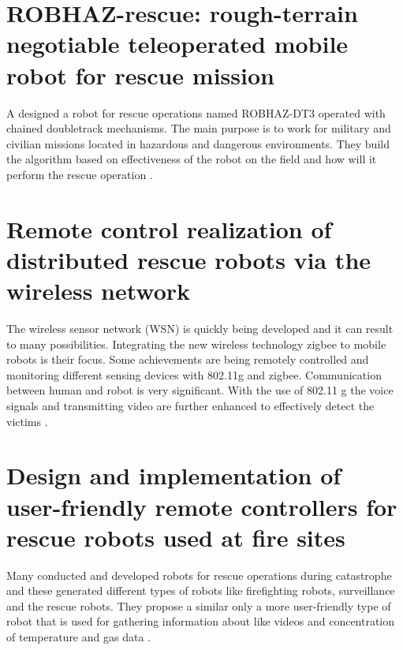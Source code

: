 \section{ROBHAZ-rescue: rough-terrain negotiable teleoperated mobile robot for rescue mission}
A designed a robot for rescue operations named ROBHAZ-DT3 operated with chained double\-track mechanisms. The main purpose is to work for military and civilian missions located in hazardous and dangerous environments. They build the algorithm based on effectiveness of the robot on the field and how will it perform the rescue operation \cite{1501248}.

\section{Remote control realization of distributed rescue robots via the wireless network}
The wireless sensor network (WSN) is quickly being developed and it can result to many possibilities. Integrating the new wireless technology zigbee to mobile robots is their focus. Some achievements are being remotely controlled and monitoring different sensing devices with 802.11g and zigbee. Communication between human and robot is very significant. With the use of 802.11 g the voice signals and transmitting video are further enhanced to effectively detect the victims \cite{4655164}.

\section{Design and implementation of user-friendly remote controllers for rescue robots used at fire sites}
Many conducted and developed robots for rescue operations during catastrophe and these generated different types of robots like fire\-fighting robots, surveillance and the rescue robots. They propose a similar only a more user-friendly type of robot that is used for gathering information about like videos and concentration of temperature and gas data \cite{5649481}.  